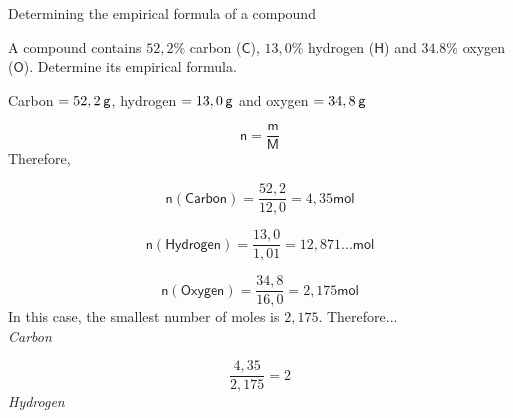     \noindent
\label{m38712*secfhsst!!!underscore!!!id1029}\vspace{.5cm} 
      \noindent 
      \begin{wex}{Determining the empirical formula of a compound }{
      \label{m38712*probfhsst!!!underscore!!!id1030}
      \label{m38712*id280897}A compound contains $52,2\%$ carbon ($\mathsf{C}$), $13,0\%$ hydrogen ($\mathsf{H}$) and $34.8\%$ oxygen ($\mathsf{O}$). Determine its empirical formula.\par 
      \vspace{5pt}
}
{ %
      \label{m38712*id280928}Carbon $=52,2\phantom{\rule{2pt}{0ex}}\mathsf{g}$, hydrogen $=13,0\phantom{\rule{2pt}{0ex}}\mathsf{g}$ and oxygen $=34,8\phantom{\rule{2pt}{0ex}}\mathsf{g}$\par 
      \label{m38712*id280954}\nopagebreak\noindent{}
        
    \begin{equation*}
    \mathsf{n}=\frac{\mathsf{m}}{\mathsf{M}}
      \end{equation*}
      \label{m38712*id280975}Therefore,\par 
      \label{m38712*id280978}\nopagebreak\noindent{}
        
    \begin{equation*}
    \mathsf{n}\left(\mathsf{Carbon}\right)=\frac{52,2}{12,0}=4,35\mathsf{mol}
      \end{equation*}
      \label{m38712*id281042}\nopagebreak\noindent{}
        
    \begin{equation*}
    \mathsf{n}\left(\mathsf{Hydrogen}\right)=\frac{13,0}{1,01}=12,871...\mathsf{mol}
      \end{equation*}
      \label{m38712*id281111}\nopagebreak\noindent{}
        
    \begin{equation*}
    \mathsf{n}\left(\mathsf{Oxygen}\right)=\frac{34,8}{16,0}=2,175\mathsf{mol}
      \end{equation*}
In this case, the smallest number of moles is $2,175$. Therefore... \\ 
      \label{m38712*id281179}
        \textsl{Carbon}
      \par 
      \label{m38712*id281185}\nopagebreak\noindent{}
        
    \begin{equation*}
    \frac{4,35}{2,175}=2
      \end{equation*}
      \label{m38712*id281217}
        \textsl{Hydrogen}
      \par 
      \label{m38712*id281223}\nopagebreak\noindent{}
        
}
\end{wex}
